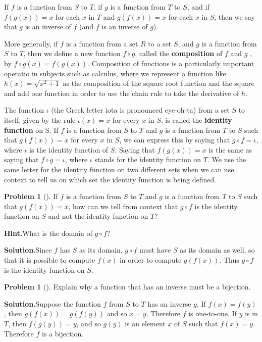 \documentclass[10pt,]{book}
\newcommand{\terminology}[1]{\textbf{#1}}
\theoremstyle{plain}
\theoremstyle{definition}
\newtheorem{activity}[project]{Problem}
\theoremstyle{definition}
\numberwithin{equation}{chapter}
\begin{document}
If \(f\) is a function from \(S\) to \(T\), if \(g\) is a function from \(T\) to \(S\), and if \(f(g(x))= x\) for each \(x\) in \(T\) and \(g(f(x)) = x\) for each \(x\) in \(S\), then we say that \(g\) is an inverse of \(f\) (and \(f\) is an inverse of \(g\)).%
\par
More generally, if \(f\) is a function from a set \(R\) to a set \(S\), and \(g\) is a function from \(S\) to \(T\), then we define a new function \(f \circ g\), called the \terminology{composition} of \(f\) and \(g\) , by \(f\circ g(x) = f(g(x))\).  Composition of functions is a particularly important operatio in subjects such as calculus, where we represent a function like \(h(x) = \sqrt{x^2 + 1}\) as the composition of the square root function and the square and add one function in order to use the chain rule to take the derivative of \(h\).%
\par
The function \(\iota\) (the Greek letter iota is pronounced eye-oh-ta) from a set \(S\) to itself, given by the rule \(\iota(x) = x\) for every \(x\) in \(S\), is called the \terminology{identity function} on S.  If \(f\) is a function from \(S\) to \(T\) and \(g\) is a function from \(T\) to \(S\) such that \(g(f(x)) = x\) for every \(x\) in \(S\), we can express this by saying that \(g\circ f = \iota\), where \(\iota\) is the identity function of \(S\). Saying that \(f(g(x)) = x\) is the same as saying that \(f\circ g = \iota\), where \(\iota\) stands for the identity function on \(T\).  We use the same letter for the identity function on two different sets when we can use context to tell us on which set the identity function is being defined.%
\begin{activity}[]\label{activity-339}
If \(f\) is a function from \(S\) to \(T\) and \(g\) is a function from \(T\) to \(S\) such that \(g(f(x)) = x\), how can we tell from context that \(g\circ f\) is the identity function on \(S\) and not the identity function on \(T\)?%
\par\medskip\noindent%
\textbf{Hint.}\quad What is the domain of \(g \circ f\)?%
\par\medskip\noindent%
\textbf{Solution.}\quad Since \(f\) has \(S\) as its domain, \(g \circ f\) must have \(S\) as its domain as well, so that it is possible to compute \(f(x)\) in order to compute \(g(f(x))\).  Thus \(g \circ f\) is the identity function on \(S\).%
\end{activity}
\begin{activity}[]\label{inversetobijection}
Explain why a function that has an inverse must be a bijection.%
\par\medskip\noindent%
\textbf{Solution.}\quad Suppose the function \(f\) from \(S\) to \(T\) has an inverse \(g\).  If \(f(x) = f(y)\), then \(g(f(x)) = g(f(y))\) and so \(x = y\).  Therefore \(f\) is one-to-one.  If \(y\) is in \(T\), then \(f(g(y)) = y\), and so \(g(y)\) is an element \(x\) of \(S\) such that \(f(x) = y\).  Therefore \(f\) is a bijection.%
\end{activity}
\end{document}
